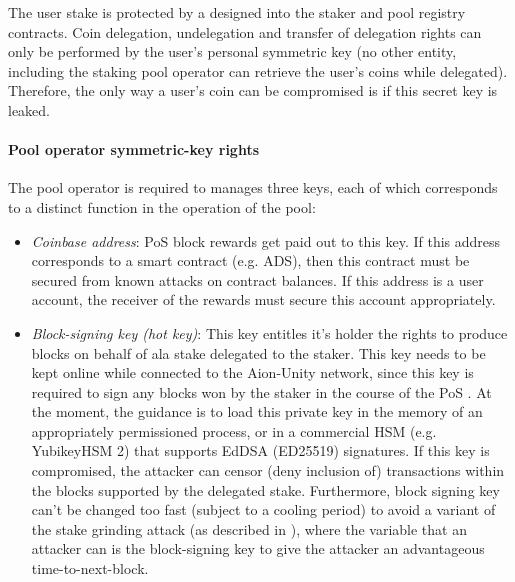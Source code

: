 The user stake is protected by a  designed into the staker and pool registry contracts. Coin delegation, undelegation and transfer of delegation rights can only be performed by the user's personal symmetric key (no other entity, including the staking pool operator can retrieve the user's coins while delegated). Therefore, the only way a user's coin can be compromised is if this secret key is leaked. 
    
\paragraph{Pool operator symmetric-key rights} The pool operator is required to manages three keys, each of which corresponds to a distinct function in the operation of the pool: 
\begin{itemize}
    \item \textit{Coinbase address}: PoS block rewards get paid out to this key. If this address corresponds to a smart contract (e.g. ADS), then this contract must be secured from known attacks on contract balances. If this address is a user account, the receiver of the rewards must secure this account appropriately.  
    \item \textit{Block-signing key (hot key)}: This key entitles it's holder the rights to produce blocks on behalf of ala stake delegated to the staker. This key needs to be kept online while connected to the Aion-Unity network, since this key is required to sign any blocks won by the staker in the course of the PoS . At the moment, the guidance is to load this private key in the memory of an appropriately permissioned process, or in a commercial HSM (e.g. YubikeyHSM 2) that supports EdDSA (ED25519) signatures. If this key is compromised, the attacker can censor (deny inclusion of) transactions within the blocks supported by the delegated stake. Furthermore, block signing key can't be changed too fast (subject to a cooling period) to avoid a variant of the stake grinding attack (as described in \cite{WZS19}), where the variable that an attacker can  is the block-signing key to give the attacker an advantageous time-to-next-block. 

\end{itemize}
